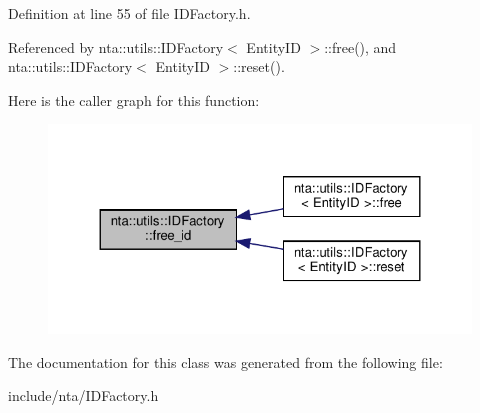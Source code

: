 Definition at line 55 of file I\+D\+Factory.\+h.



Referenced by nta\+::utils\+::\+I\+D\+Factory$<$ Entity\+I\+D $>$\+::free(), and nta\+::utils\+::\+I\+D\+Factory$<$ Entity\+I\+D $>$\+::reset().

Here is the caller graph for this function\+:\nopagebreak
\begin{figure}[H]
\begin{center}
\leavevmode
\includegraphics[width=324pt]{d6/d62/classnta_1_1utils_1_1IDFactory_ac136bf7941dcdc20ed51c680aaf4a369_icgraph}
\end{center}
\end{figure}


The documentation for this class was generated from the following file\+:\begin{DoxyCompactItemize}
\item 
include/nta/I\+D\+Factory.\+h\end{DoxyCompactItemize}
